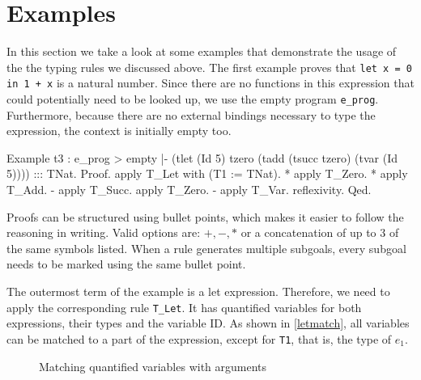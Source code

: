 \documentclass[paper = a4, fleqn, twoside]{scrreprt}
\newcommand{\coqinline}[1]{\texttt{#1}}
\begin{document}
\section{Examples}
In this section we take a look at some examples that demonstrate the usage of the the typing rules we discussed above. The first example proves that \texttt{let x = 0 in 1 + x} is a natural number. Since there are no functions in this expression that could potentially need to be looked up, we use the empty program \texttt{e\_prog}. Furthermore, because there are no external bindings necessary to type the expression, the context is initially empty too.
\begin{coqcode}
Example t3 : e_prog > empty |- (tlet (Id 5) tzero 
                                     (tadd (tsucc tzero) 
                                           (tvar (Id 5)))) ::: TNat.
Proof. 
  apply T_Let with (T1 := TNat).
    * apply T_Zero.
    * apply T_Add.
      - apply T_Succ. apply T_Zero.
      - apply T_Var. reflexivity.
Qed.
\end{coqcode}
Proofs can be structured using bullet points, which makes it easier to follow the reasoning in writing. Valid options are: $+, -, *$ or a concatenation of up to 3 of the same symbols listed. When a rule generates multiple subgoals, every subgoal needs to be marked using the same bullet point.
\par
The outermost term of the example is a let expression. Therefore, we need to apply the corresponding rule \coqinline{T_Let}. It has quantified variables for both expressions, their types and the variable ID. As shown in \autoref{letmatch}, all variables can be matched to a part of the expression, except for \coqinline{T1}, that is, the type of $e_{1}$.
\begin{figure}[H]
	\caption{Matching quantified variables with arguments}
	\label{letmatch}
\end{figure}\noindent
\end{document}
